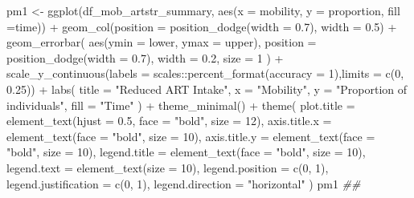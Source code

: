 \documentclass[
  letterpaper,
  DIV=11,
  numbers=noendperiod]{scrartcl}
\newenvironment{Shaded}{\begin{snugshade}}{\end{snugshade}}
\newcommand{\AttributeTok}[1]{\textcolor[rgb]{0.40,0.45,0.13}{#1}}
\newcommand{\DecValTok}[1]{\textcolor[rgb]{0.68,0.00,0.00}{#1}}
\newcommand{\DocumentationTok}[1]{\textcolor[rgb]{0.37,0.37,0.37}{\textit{#1}}}
\newcommand{\FloatTok}[1]{\textcolor[rgb]{0.68,0.00,0.00}{#1}}
\newcommand{\FunctionTok}[1]{\textcolor[rgb]{0.28,0.35,0.67}{#1}}
\newcommand{\NormalTok}[1]{\textcolor[rgb]{0.00,0.23,0.31}{#1}}
\newcommand{\OtherTok}[1]{\textcolor[rgb]{0.00,0.23,0.31}{#1}}
\newcommand{\SpecialCharTok}[1]{\textcolor[rgb]{0.37,0.37,0.37}{#1}}
\newcommand{\StringTok}[1]{\textcolor[rgb]{0.13,0.47,0.30}{#1}}
\begin{document}
\begin{Shaded}
\begin{Highlighting}[]
\NormalTok{pm1 }\OtherTok{\textless{}{-}} \FunctionTok{ggplot}\NormalTok{(df\_mob\_artstr\_summary, }\FunctionTok{aes}\NormalTok{(}\AttributeTok{x =}\NormalTok{ mobility, }\AttributeTok{y =}\NormalTok{ proportion, }\AttributeTok{fill =}\NormalTok{time)) }\SpecialCharTok{+}
  \FunctionTok{geom\_col}\NormalTok{(}\AttributeTok{position =} \FunctionTok{position\_dodge}\NormalTok{(}\AttributeTok{width =} \FloatTok{0.7}\NormalTok{), }\AttributeTok{width =} \FloatTok{0.5}\NormalTok{) }\SpecialCharTok{+}
  \FunctionTok{geom\_errorbar}\NormalTok{(}
    \FunctionTok{aes}\NormalTok{(}\AttributeTok{ymin =}\NormalTok{ lower, }\AttributeTok{ymax =}\NormalTok{ upper),}
    \AttributeTok{position =} \FunctionTok{position\_dodge}\NormalTok{(}\AttributeTok{width =} \FloatTok{0.7}\NormalTok{),}
    \AttributeTok{width =} \FloatTok{0.2}\NormalTok{,}
    \AttributeTok{size =} \DecValTok{1}
\NormalTok{  ) }\SpecialCharTok{+}
  \FunctionTok{scale\_y\_continuous}\NormalTok{(}\AttributeTok{labels =}\NormalTok{ scales}\SpecialCharTok{::}\FunctionTok{percent\_format}\NormalTok{(}\AttributeTok{accuracy =} \DecValTok{1}\NormalTok{),}\AttributeTok{limits =} \FunctionTok{c}\NormalTok{(}\DecValTok{0}\NormalTok{, }\FloatTok{0.25}\NormalTok{)) }\SpecialCharTok{+}
  \FunctionTok{labs}\NormalTok{(}
    \AttributeTok{title =} \StringTok{"Reduced ART Intake"}\NormalTok{,}
    \AttributeTok{x =} \StringTok{"Mobility"}\NormalTok{,}
    \AttributeTok{y =} \StringTok{"Proportion of individuals"}\NormalTok{,}
    \AttributeTok{fill =} \StringTok{"Time"}
\NormalTok{  ) }\SpecialCharTok{+}
  \FunctionTok{theme\_minimal}\NormalTok{() }\SpecialCharTok{+}
  \FunctionTok{theme}\NormalTok{(}
    \AttributeTok{plot.title =} \FunctionTok{element\_text}\NormalTok{(}\AttributeTok{hjust =} \FloatTok{0.5}\NormalTok{, }\AttributeTok{face =} \StringTok{"bold"}\NormalTok{, }\AttributeTok{size =} \DecValTok{12}\NormalTok{),}
    \AttributeTok{axis.title.x =} \FunctionTok{element\_text}\NormalTok{(}\AttributeTok{face =} \StringTok{"bold"}\NormalTok{, }\AttributeTok{size =} \DecValTok{10}\NormalTok{),}
    \AttributeTok{axis.title.y =} \FunctionTok{element\_text}\NormalTok{(}\AttributeTok{face =} \StringTok{"bold"}\NormalTok{, }\AttributeTok{size =} \DecValTok{10}\NormalTok{),}
    \AttributeTok{legend.title =} \FunctionTok{element\_text}\NormalTok{(}\AttributeTok{face =} \StringTok{"bold"}\NormalTok{, }\AttributeTok{size =} \DecValTok{10}\NormalTok{),}
    \AttributeTok{legend.text =} \FunctionTok{element\_text}\NormalTok{(}\AttributeTok{size =} \DecValTok{10}\NormalTok{),}
    \AttributeTok{legend.position =} \FunctionTok{c}\NormalTok{(}\DecValTok{0}\NormalTok{, }\DecValTok{1}\NormalTok{),}
    \AttributeTok{legend.justification =} \FunctionTok{c}\NormalTok{(}\DecValTok{0}\NormalTok{, }\DecValTok{1}\NormalTok{),}
    \AttributeTok{legend.direction =} \StringTok{"horizontal"}
\NormalTok{  )}
\NormalTok{pm1 }\DocumentationTok{\#\#}
\end{Highlighting}
\end{Shaded}
\end{document}
